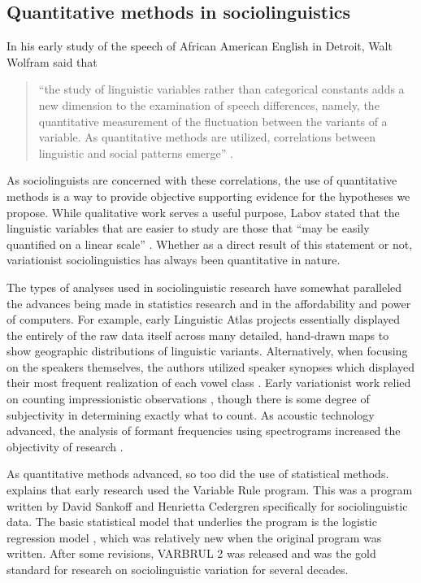 \subsection{Quantitative methods in sociolinguistics}
\label{quantitative_methods_sociolinguistics}

In his early study of the speech of African American English in Detroit, Walt Wolfram said that
\begin{quote}
    ``the study of linguistic variables rather than categorical constants adds a new dimension to the examination of speech differences, namely, the quantitative measurement of the fluctuation between the variants of a variable. As quantitative methods are utilized, correlations between linguistic and social patterns emerge'' \citep[47]{wolfram_1969}.
\end{quote}
As sociolinguists are concerned with these correlations, the use of quantitative methods is a way to provide objective supporting evidence for the hypotheses we propose. While qualitative work serves a useful purpose, Labov stated that the linguistic variables that are easier to study are those that ``may be easily quantified on a linear scale'' \citeyearpar[49]{labov_1966_diss}. Whether as a direct result of this statement or not, variationist sociolinguistics has always been quantitative in nature.

The types of analyses used in sociolinguistic research have somewhat paralleled the advances being made in statistics research and in the affordability and power of computers. For example, early Linguistic Atlas projects \citep{kurath_1939_lane} essentially displayed the entirely of the raw data itself across many detailed, hand-drawn maps to show geographic distributions of linguistic variants. Alternatively, when focusing on the speakers themselves, the authors utilized speaker synopses which displayed their most frequent realization of each vowel class \citep{kurath_mcdavid_1961}. Early variationist work relied on counting  impressionistic observations \citep{labov_1966_diss, wolfram_1969}, though there is some degree of subjectivity in determining exactly what to count. As acoustic technology advanced, the analysis of formant frequencies using spectrograms increased the objectivity of research \citep{peterson_barney_1952, labov_1972_LYS}.

As quantitative methods advanced, so too did the use of statistical methods. \citet[107--116]{tagliamonte_2016}  explains that early research used the Variable Rule program. This was a program written by David Sankoff and Henrietta Cedergren specifically for sociolinguistic data. The basic statistical model that underlies the program is the logistic regression model \citep{cox_1958}, which was relatively new when the original program was written. After some revisions, VARBRUL 2 \citep{sankoff_1975_varbrul} was released  and was the gold standard for research on sociolinguistic variation for several decades.

